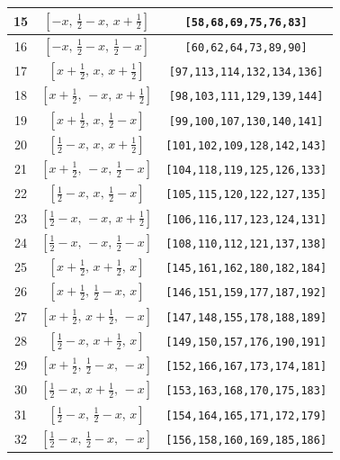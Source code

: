 \documentclass[fleqn,8pt]{jsarticle}
\begin{document}
\begin{longtable}{ccc}
15 & $\left[ - x,\, \frac{1}{2} - x,\, x + \frac{1}{2} \right]$ & {\tt [58,68,69,75,76,83]} \\ \hline
16 & $\left[ - x,\, \frac{1}{2} - x,\, \frac{1}{2} - x \right]$ & {\tt [60,62,64,73,89,90]} \\ \hline
17 & $\left[ x + \frac{1}{2},\, x,\, x + \frac{1}{2} \right]$ & {\tt [97,113,114,132,134,136]} \\ \hline
18 & $\left[ x + \frac{1}{2},\, - x,\, x + \frac{1}{2} \right]$ & {\tt [98,103,111,129,139,144]} \\ \hline
19 & $\left[ x + \frac{1}{2},\, x,\, \frac{1}{2} - x \right]$ & {\tt [99,100,107,130,140,141]} \\ \hline
20 & $\left[ \frac{1}{2} - x,\, x,\, x + \frac{1}{2} \right]$ & {\tt [101,102,109,128,142,143]} \\ \hline
21 & $\left[ x + \frac{1}{2},\, - x,\, \frac{1}{2} - x \right]$ & {\tt [104,118,119,125,126,133]} \\ \hline
22 & $\left[ \frac{1}{2} - x,\, x,\, \frac{1}{2} - x \right]$ & {\tt [105,115,120,122,127,135]} \\ \hline
23 & $\left[ \frac{1}{2} - x,\, - x,\, x + \frac{1}{2} \right]$ & {\tt [106,116,117,123,124,131]} \\ \hline
24 & $\left[ \frac{1}{2} - x,\, - x,\, \frac{1}{2} - x \right]$ & {\tt [108,110,112,121,137,138]} \\ \hline
25 & $\left[ x + \frac{1}{2},\, x + \frac{1}{2},\, x \right]$ & {\tt [145,161,162,180,182,184]} \\ \hline
26 & $\left[ x + \frac{1}{2},\, \frac{1}{2} - x,\, x \right]$ & {\tt [146,151,159,177,187,192]} \\ \hline
27 & $\left[ x + \frac{1}{2},\, x + \frac{1}{2},\, - x \right]$ & {\tt [147,148,155,178,188,189]} \\ \hline
28 & $\left[ \frac{1}{2} - x,\, x + \frac{1}{2},\, x \right]$ & {\tt [149,150,157,176,190,191]} \\ \hline
29 & $\left[ x + \frac{1}{2},\, \frac{1}{2} - x,\, - x \right]$ & {\tt [152,166,167,173,174,181]} \\ \hline
30 & $\left[ \frac{1}{2} - x,\, x + \frac{1}{2},\, - x \right]$ & {\tt [153,163,168,170,175,183]} \\ \hline
31 & $\left[ \frac{1}{2} - x,\, \frac{1}{2} - x,\, x \right]$ & {\tt [154,164,165,171,172,179]} \\ \hline
32 & $\left[ \frac{1}{2} - x,\, \frac{1}{2} - x,\, - x \right]$ & {\tt [156,158,160,169,185,186]} \\ \hline

\end{longtable}
\end{document}
